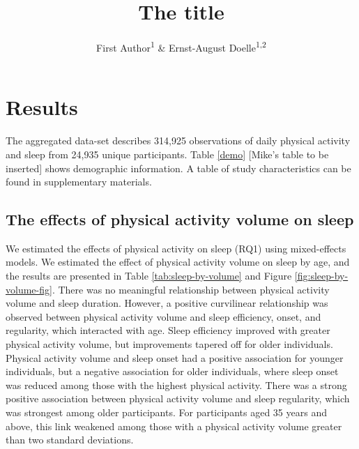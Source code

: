 \documentclass[
  man]{apa6}
\title{The title}
\author{First Author\textsuperscript{1} \& Ernst-August Doelle\textsuperscript{1,2}}
\date{}
\affiliation{\vspace{0.5cm}\textsuperscript{1} Wilhelm-Wundt-University\\\textsuperscript{2} Konstanz Business School}
\begin{document}
\maketitle

\hypertarget{results}{%
\section{Results}\label{results}}

The aggregated data-set describes 314,925 observations of daily physical activity and sleep from 24,935 unique participants. Table \ref{demo} {[}Mike's table to be inserted{]} shows demographic information. A table of study characteristics can be found in supplementary materials.

\hypertarget{the-effects-of-physical-activity-volume-on-sleep}{%
\subsection{The effects of physical activity volume on sleep}\label{the-effects-of-physical-activity-volume-on-sleep}}

We estimated the effects of physical activity on sleep (RQ1) using mixed-effects models. We estimated the effect of physical activity volume on sleep by age, and the results are presented in Table \ref{tab:sleep-by-volume} and Figure \ref{fig:sleep-by-volume-fig}. There was no meaningful relationship between physical activity volume and sleep duration. However, a positive curvilinear relationship was observed between physical activity volume and sleep efficiency, onset, and regularity, which interacted with age. Sleep efficiency improved with greater physical activity volume, but improvements tapered off for older individuals. Physical activity volume and sleep onset had a positive association for younger individuals, but a negative association for older individuals, where sleep onset was reduced among those with the highest physical activity. There was a strong positive association between physical activity volume and sleep regularity, which was strongest among older participants. For participants aged 35 years and above, this link weakened among those with a physical activity volume greater than two standard deviations.

\renewcommand{\arraystretch}{0.7}
\end{document}
